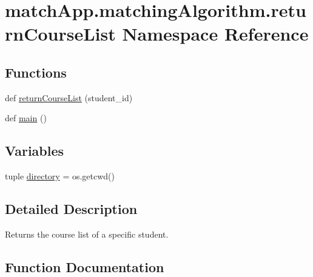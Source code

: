 \hypertarget{namespacematch_app_1_1matching_algorithm_1_1return_course_list}{}\section{match\+App.\+matching\+Algorithm.\+return\+Course\+List Namespace Reference}
\label{namespacematch_app_1_1matching_algorithm_1_1return_course_list}
\subsection*{Functions}
\begin{DoxyCompactItemize}
\item 
def \hyperlink{namespacematch_app_1_1matching_algorithm_1_1return_course_list_a7e87acbe11cdf17f99313d6a4091416d}{return\+Course\+List} (student\+\_\+id)
\item 
def \hyperlink{namespacematch_app_1_1matching_algorithm_1_1return_course_list_aa586c1a24797309c9c63f21a9789999b}{main} ()
\end{DoxyCompactItemize}
\subsection*{Variables}
\begin{DoxyCompactItemize}
\item 
tuple \hyperlink{namespacematch_app_1_1matching_algorithm_1_1return_course_list_a12ca8c76c90025f5c4603f02d4fb0c70}{directory} = os.\+getcwd()
\end{DoxyCompactItemize}


\subsection{Detailed Description}
\begin{DoxyVerb}Returns the course list of a specific student. 
\end{DoxyVerb}
 

\subsection{Function Documentation}
\hypertarget{namespacematch_app_1_1matching_algorithm_1_1return_course_list_aa586c1a24797309c9c63f21a9789999b}{}
